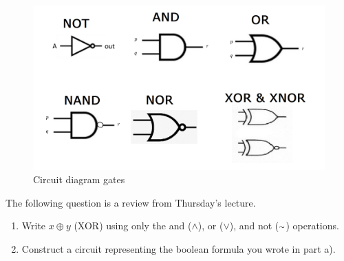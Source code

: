 \begin{figure}[ht]
    \centering
    \includegraphics[width=\textwidth]{Ch2/circuit_ops.png}
    \caption{Circuit diagram gates}
    \label{fig:circ}
\end{figure}

The following question is a review from Thursday's lecture.

\begin{enumerate}
    \item Write $x \oplus y$ (XOR) using only the and ($\land$), or ($\lor$), and not ($\shortsim$) operations.
    \item Construct a circuit representing the boolean formula you wrote in part a).
\end{enumerate}